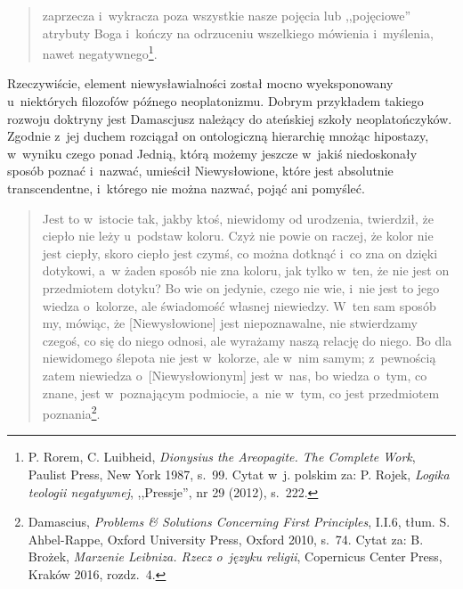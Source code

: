 \begin{quote}
zaprzecza i~wykracza poza wszystkie nasze pojęcia lub ,,pojęciowe'' atrybuty Boga i~kończy na odrzuceniu wszelkiego mówienia i~myślenia, nawet negatywnego\footnote{P. Rorem, C. Luibheid, \textit{Dionysius the Areopagite. The Complete Work}, Paulist Press, New York 1987, s.~99. Cytat w~j. polskim za: P. Rojek, \textit{Logika teologii negatywnej}, ,,Pressje'', nr 29 (2012), s.~222.}.
\end{quote}

Rzeczywiście, element niewysławialności został mocno wyeksponowany u~niektórych filozofów późnego neoplatonizmu. Dobrym przykładem takiego rozwoju doktryny jest Damascjusz należący do ateńskiej szkoły neoplatończyków. Zgodnie z~jej duchem rozciągał on ontologiczną hierarchię mnożąc hipostazy, w~wyniku czego ponad Jednią, którą możemy jeszcze w~jakiś niedoskonały sposób poznać i~nazwać, umieścił Niewysłowione, które jest absolutnie transcendentne, i~którego nie można nazwać, pojąć ani pomyśleć.

\begin{quote}
Jest to w~istocie tak, jakby ktoś, niewidomy od urodzenia, twierdził, że ciepło nie leży u~podstaw koloru. Czyż nie powie on raczej, że kolor nie jest ciepły, skoro ciepło jest czymś, co można dotknąć i~co zna on dzięki dotykowi, a~w żaden sposób nie zna koloru, jak tylko w~ten, że nie jest on przedmiotem dotyku? Bo wie on jedynie, czego nie wie, i~nie jest to jego wiedza o~kolorze, ale świadomość własnej niewiedzy. W~ten sam sposób my, mówiąc, że [Niewysłowione] jest niepoznawalne, nie stwierdzamy czegoś, co się do niego odnosi, ale wyrażamy naszą relację do niego. Bo dla niewidomego ślepota nie jest w~kolorze, ale w~nim samym; z~pewnością zatem niewiedza o~[Niewysłowionym] jest w~nas, bo wiedza o~tym, co znane, jest w~poznającym podmiocie, a~nie w~tym, co jest przedmiotem poznania\footnote{Damascius, \textit{Problems \& Solutions Concerning First Principles}, I.I.6, tłum. S. Ahbel-Rappe, Oxford University Press, Oxford 2010, s.~74. Cytat za: B. Brożek, \textit{Marzenie Leibniza. Rzecz o~języku religii}, Copernicus Center Press, Kraków 2016, rozdz.~4.}.
\end{quote}

